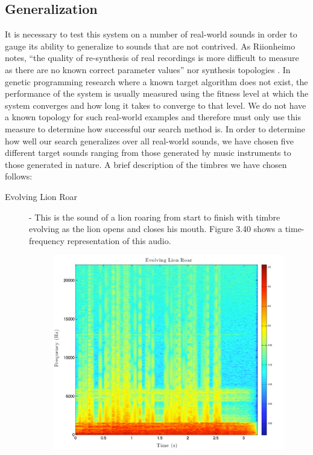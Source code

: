 \documentclass[a4paper,12pt]{report} 	%
\numberwithin{figure}{chapter}
\numberwithin{table}{chapter}
\numberwithin{equation}{chapter}
\begin{document}
\begin{flushleft}
\subsection{Generalization}
It is necessary to test this system on a number of real-world sounds in order to gauge its ability to generalize to sounds that are not contrived. As Riionheimo notes, ``the quality of re-synthesis of real recordings is more difficult to measure as there are no known correct parameter values'' nor synthesis topologies \cite[p. 13]{Riionheimo:2003qo}. In genetic programming research where a known target algorithm does not exist, the performance of the system is usually measured using the fitness level at which the system converges and how long it takes to converge to that level. We do not have a known topology for such real-world examples and therefore must only use this measure to determine how successful our search method is. In order to determine how well our search generalizes over all real-world sounds, we have chosen five different target sounds ranging from those generated by music instruments to those generated in nature. A brief description of the timbres we have chosen follows:
\begin{description}
\item[Evolving Lion Roar] - This is the sound of a lion roaring from start to finish with timbre evolving as the lion opens and closes his mouth. Figure 3.40 shows a time-frequency representation of this audio.
\begin{figure}[h!]
\begin{center}
\includegraphics[scale=0.35,width=\linewidth]{EvolvingLionRoar}

\end{center}
\end{figure}
\end{description}
\end{flushleft}
\end{document}
